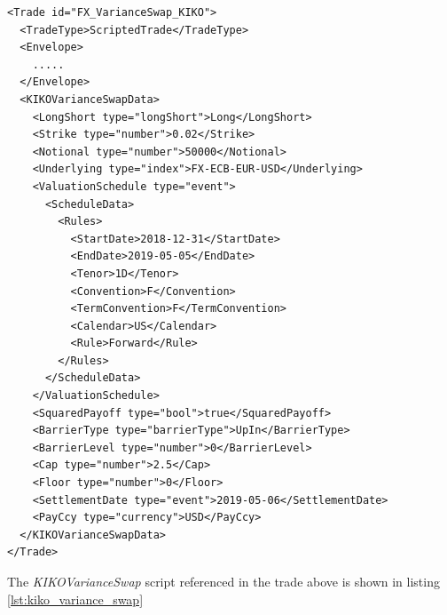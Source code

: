\begin{verbatim}
<Trade id="FX_VarianceSwap_KIKO">
  <TradeType>ScriptedTrade</TradeType>
  <Envelope>
    .....
  </Envelope>
  <KIKOVarianceSwapData>
    <LongShort type="longShort">Long</LongShort>
    <Strike type="number">0.02</Strike>
    <Notional type="number">50000</Notional>
    <Underlying type="index">FX-ECB-EUR-USD</Underlying>
    <ValuationSchedule type="event">
      <ScheduleData>
        <Rules>
          <StartDate>2018-12-31</StartDate>
          <EndDate>2019-05-05</EndDate>
          <Tenor>1D</Tenor>
          <Convention>F</Convention>
          <TermConvention>F</TermConvention>
          <Calendar>US</Calendar>
          <Rule>Forward</Rule>
        </Rules>
      </ScheduleData>
    </ValuationSchedule>
    <SquaredPayoff type="bool">true</SquaredPayoff>
    <BarrierType type="barrierType">UpIn</BarrierType>
    <BarrierLevel type="number">0</BarrierLevel>
    <Cap type="number">2.5</Cap>
    <Floor type="number">0</Floor>
    <SettlementDate type="event">2019-05-06</SettlementDate>
    <PayCcy type="currency">USD</PayCcy>
  </KIKOVarianceSwapData>
</Trade>
\end{verbatim}

The \emph{KIKOVarianceSwap} script referenced in the trade above is shown in listing
\ref{lst:kiko_variance_swap}

